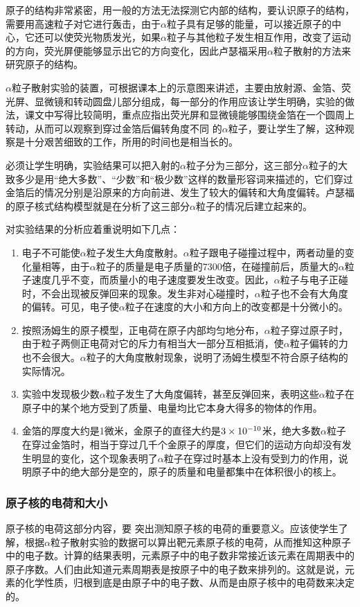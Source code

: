 原子的结构非常紧密，用一般的方法无法探测它内部的结构，要认识原子的结构，需要用高速粒子对它进行轰击，由于$\alpha$粒子具有足够的能量，可以接近原子的中心，它还可以使荧光物质发光，如果$\alpha$粒子与其他粒子发生相互作用，改变了运动的方向，荧光屏便能够显示出它的方向变化，因此卢瑟福采用$\alpha$粒子散射的方法来研究原子的结构。

$\alpha$粒子散射实验的装置，可根据课本上的示意图来讲述，主要由放射源、金箔、荧光屏、显微镜和转动圆盘儿部分组成，每一部分的作用应该让学生明确，实验的做法，课文中写得比较简明，重点应指出荧光屏和显微镜能够围绕金箔在一个圆周上转动，从而可以观察到穿过金箔后偏转角度不同
的$\alpha$粒子，要让学生了解，这种观察是十分艰苦细致的工作，所用的时间也是相当长的。

必须让学生明确，实验结果可以把入射的$\alpha$粒子分为三部分，这三部分$\alpha$粒子的大致多少是用“绝大多数”、“少数”和“极少数”这样的数量形容词来描述的，它们穿过金箔后的情况分别是沿原来的方向前进、发生了较大的偏转和大角度偏转。卢瑟福的原子核式结构模型就是在分析了这三部分$\alpha$粒子的情况后建立起来的。

对实验结果的分析应着重说明如下几点：
\begin{enumerate}
\item 电子不可能使$\alpha$粒子发生大角度散射。$\alpha$粒子跟电子碰撞过程中，两者动量的变化量相等，由于$\alpha$粒子的质量是电子质量的7300倍，在碰撞前后，质量大的$\alpha$粒子速度几乎不变，而质量小的电子速度要发生改变。因此，$\alpha$粒子与电子正碰时，不会出现被反弹回来的现象。发生非对心碰撞时，$\alpha$粒子也不会有大角度的偏转。可见，电子使$\alpha$粒子在速度的大小和方向上的改变都是十分微小的。
\item 按照汤姆生的原子模型，正电荷在原子内部均匀地分布，$\alpha$粒子穿过原子时，由于粒子两侧正电荷对它的斥力有相当大一部分互相抵消，使$\alpha$粒子偏转的力也不会很大。$\alpha$粒子的大角度散射现象，说明了汤姆生模型不符合原子结构的实际情况。
\item 实验中发现极少数$\alpha$粒子发生了大角度偏转，甚至反弹回来，表明这些$\alpha$粒子在原子中的某个地方受到了质量、电量均比它本身大得多的物体的作用。
\item 金箔的厚度大约是1微米，金原子的直径大约是$3\times10^{-10}$米，绝大多数$\alpha$粒子在穿过金箔时，相当于穿过几千个金原子的厚度，但它们的运动方向却没有发生明显的变化，这个现象表明了$\alpha$粒子在穿过时基本上没有受到力的作用，说明原子中的绝大部分是空的，原子的质量和电量都集中在体积很小的核上。
\end{enumerate}

\subsubsection{原子核的电荷和大小}
 原子核的电荷这部分内容，要
突出测知原子核的电荷的重要意义。应该使学生了解，根据$\alpha$粒子散射实验的数据可以算出靶元素原子核的电荷，从而推知这种原子中的电子数。计算的结果表明，元素原子中的电子数非常接近该元素在周期表中的原子序数。人们由此知道元素周期表是按原子中的电子数来排列的。这就是说，元素的化学性质，归根到底是由原子中的电子数、从而是由原子核中的电荷数来决定的。

